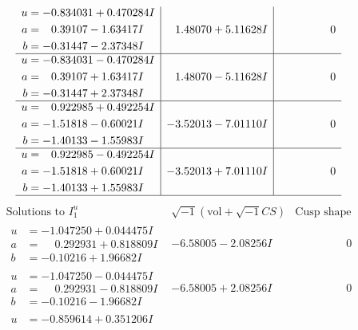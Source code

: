 \documentclass[1p]{elsarticle_modified}
\theoremstyle{definition}
\newcommand{\I}{\sqrt{-1}}
\begin{document}
$$\begin{array}{c|c|c}
\begin{aligned}
u &= -0.834031 + 0.470284 I \\
a &= \phantom{-}0.39107 - 1.63417 I \\
b &= -0.31447 - 2.37348 I\end{aligned}
 & \phantom{-}1.48070 + 5.11628 I & \phantom{-0.000000 } 0 \\ \hline\begin{aligned}
u &= -0.834031 - 0.470284 I \\
a &= \phantom{-}0.39107 + 1.63417 I \\
b &= -0.31447 + 2.37348 I\end{aligned}
 & \phantom{-}1.48070 - 5.11628 I & \phantom{-0.000000 } 0 \\ \hline\begin{aligned}
u &= \phantom{-}0.922985 + 0.492254 I \\
a &= -1.51818 - 0.60021 I \\
b &= -1.40133 - 1.55983 I\end{aligned}
 & -3.52013 - 7.01110 I & \phantom{-0.000000 } 0 \\ \hline\begin{aligned}
u &= \phantom{-}0.922985 - 0.492254 I \\
a &= -1.51818 + 0.60021 I \\
b &= -1.40133 + 1.55983 I\end{aligned}
 & -3.52013 + 7.01110 I & \phantom{-0.000000 } 0\\
 \hline 
 \end{array}$$\newpage$$\begin{array}{c|c|c}  
\text{Solutions to }I^u_{1}& \I (\text{vol} + \sqrt{-1}CS) & \text{Cusp shape}\\
 \hline 
\begin{aligned}
u &= -1.047250 + 0.044475 I \\
a &= \phantom{-}0.292931 + 0.818809 I \\
b &= -0.10216 + 1.96682 I\end{aligned}
 & -6.58005 - 2.08256 I & \phantom{-0.000000 } 0 \\ \hline\begin{aligned}
u &= -1.047250 - 0.044475 I \\
a &= \phantom{-}0.292931 - 0.818809 I \\
b &= -0.10216 - 1.96682 I\end{aligned}
 & -6.58005 + 2.08256 I & \phantom{-0.000000 } 0 \\ \hline\begin{aligned}
u &= -0.859614 + 0.351206 I \\

\end{aligned}
\end{array}$$
\end{document}
